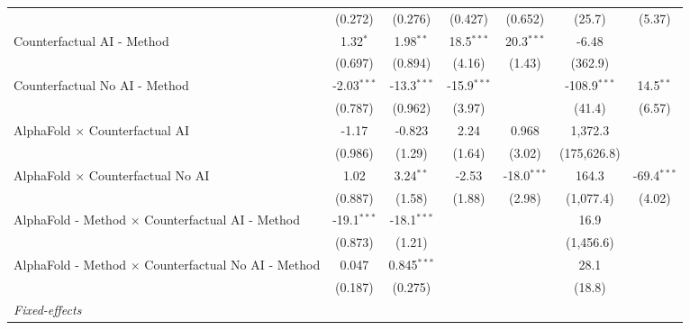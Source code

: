 \begin{tabular}{lcccccc}
                                                              & (0.272)       & (0.276)       & (0.427)       & (0.652)       & (25.7)         & (5.37)\\   
   Counterfactual AI - Method                                 & 1.32$^{*}$    & 1.98$^{**}$   & 18.5$^{***}$  & 20.3$^{***}$  & -6.48          &   \\   
                                                              & (0.697)       & (0.894)       & (4.16)        & (1.43)        & (362.9)        &   \\   
   Counterfactual No AI - Method                              & -2.03$^{***}$ & -13.3$^{***}$ & -15.9$^{***}$ &               & -108.9$^{***}$ & 14.5$^{**}$\\   
                                                              & (0.787)       & (0.962)       & (3.97)        &               & (41.4)         & (6.57)\\   
   AlphaFold $\times$ Counterfactual AI                       & -1.17         & -0.823        & 2.24          & 0.968         & 1,372.3        &   \\   
                                                              & (0.986)       & (1.29)        & (1.64)        & (3.02)        & (175,626.8)    &   \\   
   AlphaFold $\times$ Counterfactual No AI                    & 1.02          & 3.24$^{**}$   & -2.53         & -18.0$^{***}$ & 164.3          & -69.4$^{***}$\\   
                                                              & (0.887)       & (1.58)        & (1.88)        & (2.98)        & (1,077.4)      & (4.02)\\   
   AlphaFold - Method $\times$ Counterfactual AI - Method     & -19.1$^{***}$ & -18.1$^{***}$ &               &               & 16.9           &   \\   
                                                              & (0.873)       & (1.21)        &               &               & (1,456.6)      &   \\   
   AlphaFold - Method $\times$ Counterfactual No AI - Method  & 0.047         & 0.845$^{***}$ &               &               & 28.1           &   \\   
                                                              & (0.187)       & (0.275)       &               &               & (18.8)         &   \\   
   \midrule
   \emph{Fixed-effects}\\

\end{tabular}
